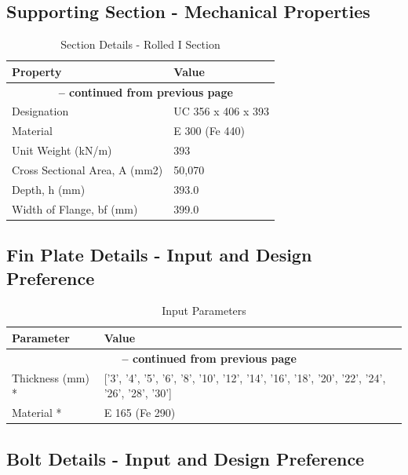 \documentclass[12pt]{article}
\begin{document}
\FloatBarrier

\subsection{Supporting Section - Mechanical Properties}

\begin{longtable}{ll}
\caption{Section Details - Rolled I Section}
\label{tab:section-details}
\cellcolor{OsdagGreen} Property & \cellcolor{OsdagGreen} Value \\ \hline
\endfirsthead
\multicolumn{2}{c}{{\bfseries \tablename\ \thetable{} -- continued from previous page}} \\
\endhead
\endfoot
\endlastfoot
Designation & UC 356 x 406 x 393 \\
\hline
Material & E 300 (Fe 440) \\
\hline
Unit Weight (kN/m) & 393 \\
\hline
Cross Sectional Area, A (mm2) & 50,070 \\
\hline
Depth, h (mm) & 393.0 \\
\hline
Width of Flange, bf (mm) & 399.0 \\
\hline
\end{longtable}

\FloatBarrier

\subsection{Fin Plate Details - Input and Design Preference}

\begin{longtable}{ll}
\caption{Input Parameters}
\label{tab:input}
Parameter & Value \\ \hline
\endfirsthead
\multicolumn{2}{c}{{\bfseries \tablename\ \thetable{} -- continued from previous page}} \\
\endhead
\endfoot
\endlastfoot
Thickness (mm) * & ['3', '4', '5', '6', '8', '10', '12', '14', '16', '18', '20', '22', '24', '26', '28', '30'] \\
\hline
Material * & E 165 (Fe 290) \\
\hline
\end{longtable}

\FloatBarrier

\subsection{Bolt Details - Input and Design Preference}
\end{document}
